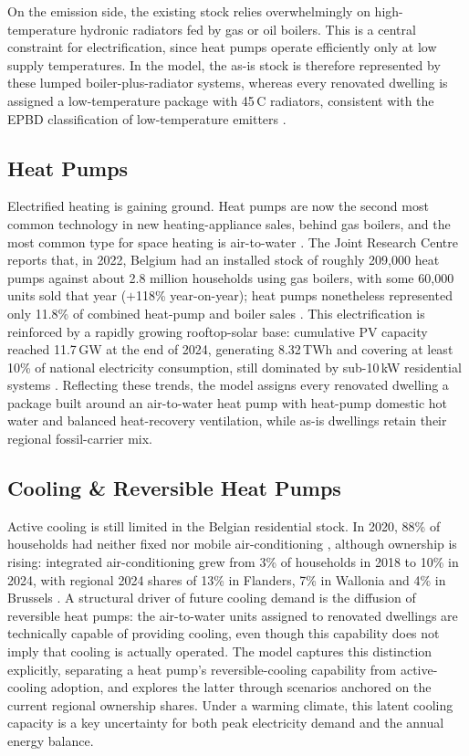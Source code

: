 On the emission side, the existing stock relies overwhelmingly on high-temperature
hydronic radiators fed by gas or oil boilers. This is a central constraint for
electrification, since heat pumps operate efficiently only at low supply
temperatures. In the model, the as-is stock is therefore represented by these
lumped boiler-plus-radiator systems, whereas every renovated dwelling is assigned
a low-temperature package with 45\,\textdegree C radiators, consistent with the
EPBD classification of low-temperature emitters \cite{epbd_2024}.

\subsection{Heat Pumps}
Electrified heating is gaining ground. Heat pumps are now the second most common
technology in new heating-appliance sales, behind gas boilers, and the most
common type for space heating is air-to-water \cite{rap_belgium_2024}. The Joint
Research Centre reports that, in 2022, Belgium had an installed stock of roughly
209{,}000 heat pumps against about 2.8 million households using gas boilers, with
some 60{,}000 units sold that year ($+$118\% year-on-year); heat pumps
nonetheless represented only 11.8\% of combined heat-pump and boiler sales
\cite{JRC2022HeatPumpBelgium}. This electrification is reinforced by a rapidly
growing rooftop-solar base: cumulative PV capacity reached 11.7\,GW at the end of
2024, generating 8.32\,TWh and covering at least 10\% of national electricity
consumption, still dominated by sub-10\,kW residential systems
\cite{vermang2024_pvps_belgium}. Reflecting these trends, the model assigns every
renovated dwelling a package built around an air-to-water heat pump with
heat-pump domestic hot water and balanced heat-recovery ventilation, while as-is
dwellings retain their regional fossil-carrier mix.

\subsection{Cooling \& Reversible Heat Pumps}
Active cooling is still limited in the Belgian residential stock. In 2020, 88\% of
households had neither fixed nor mobile air-conditioning
\cite{fps_economy_household_energy_2020}, although ownership is rising: integrated
air-conditioning grew from 3\% of households in 2018 to 10\% in 2024, with
regional 2024 shares of 13\% in Flanders, 7\% in Wallonia and 4\% in Brussels
\cite{statbel_hbs_2024}. A structural driver of future cooling demand is the
diffusion of reversible heat pumps: the air-to-water units assigned to renovated
dwellings are technically capable of providing cooling, even though this
capability does not imply that cooling is actually operated. The model captures
this distinction explicitly, separating a heat pump's reversible-cooling
capability from active-cooling adoption, and explores the latter through scenarios
anchored on the current regional ownership shares. Under a warming climate, this
latent cooling capacity is a key uncertainty for both peak electricity demand and
the annual energy balance.
